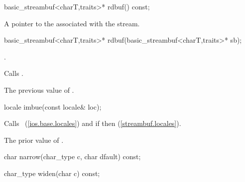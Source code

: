 %
\begin{itemdecl}
basic_streambuf<charT,traits>* rdbuf() const;
\end{itemdecl}

\begin{itemdescr}
\pnum
\returns
A pointer to the
associated with the stream.
\end{itemdescr}

%
%
\begin{itemdecl}
basic_streambuf<charT,traits>* rdbuf(basic_streambuf<charT,traits>* sb);
\end{itemdecl}

\begin{itemdescr}
\pnum
\postcondition
{}.

\pnum
\effects
Calls
.

\pnum
\returns
The previous value of
.
\end{itemdescr}

%
\begin{itemdecl}
locale imbue(const locale& loc);
\end{itemdecl}

\begin{itemdescr}
\pnum
\effects
Calls
~(\ref{ios.base.locales})
and
if
then
 (\ref{streambuf.locales}).

\pnum
\returns
The prior value of
.
\end{itemdescr}

%
\begin{itemdecl}
char narrow(char_type c, char dfault) const;
\end{itemdecl}

\begin{itemdescr}
\pnum
\returns
{}
\end{itemdescr}

%
\begin{itemdecl}
char_type widen(char c) const;
\end{itemdecl}

\begin{itemdescr}
\pnum
\returns
{}
\end{itemdescr}

